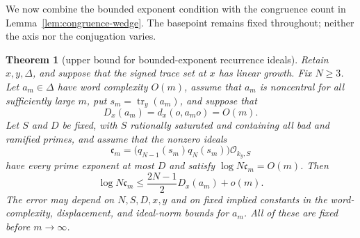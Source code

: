 \documentclass[11pt,reqno]{amsart}
\newtheorem{theorem}{Theorem}[section]
\theoremstyle{definition}
\theoremstyle{remark}
\newcommand{\cO}{\mathcal O}
\newcommand{\Tr}{\operatorname{tr}}
\begin{document}
We now combine the bounded exponent condition with the congruence count in
Lemma~\ref{lem:congruence-wedge}.  The basepoint remains fixed throughout;
neither the axis nor the conjugation varies.

\begin{theorem}[upper bound for bounded-exponent recurrence ideals]
\label{thm:moving-congruence-wedge}
Retain \(x,y,\Delta\), and suppose that the signed trace set at \(x\) has
linear growth.  Fix \(N\ge3\).  Let \(a_m\in\Delta\) have word complexity
\(O(m)\), assume that \(a_m\) is noncentral for all sufficiently large
\(m\), put \(s_m=\Tr_y(a_m)\), and suppose that
\[
 D_x(a_m)=d_x(o,a_mo)=O(m).
\]
Let \(S\) and \(D\) be fixed, with \(S\) rationally saturated and containing
all bad and ramified primes, and assume that the nonzero ideals
\[
 \mathfrak c_m=
 \bigl(q_{N-1}(s_m)q_N(s_m)\bigr)\cO_{k_y,S}
\]
have every prime exponent at most \(D\) and satisfy
\(\log N\mathfrak c_m=O(m)\).  Then
\[
 \log N\mathfrak c_m
 \le\frac{2N-1}{2}D_x(a_m)+o(m).
\tag{13.10mov18}
\]
The error may depend on \(N,S,D,x,y\) and on fixed implied constants in
the word-complexity, displacement, and ideal-norm bounds for \(a_m\).  All
of these are fixed before \(m\to\infty\).
\end{theorem}
\end{document}
